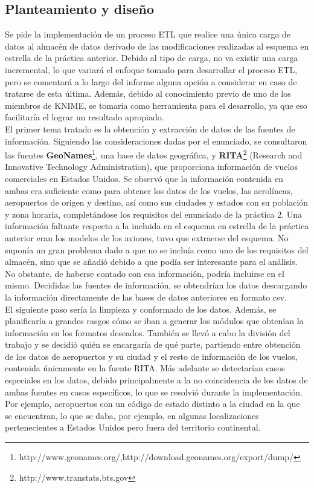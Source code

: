 \documentclass{article}
\begin{document}
\subsection{Planteamiento y diseño}
Se pide la implementación de un proceso ETL que realice una única carga de datos al almacén de datos derivado de las modificaciones realizadas al esquema en estrella de la práctica anterior. Debido al tipo de carga, no va existir una carga incremental, lo que variará el enfoque tomado para desarrollar el proceso ETL, pero se comentará a lo largo del informe alguna opción a considerar en caso de tratarse de esta última. Además, debido al conocimiento previo de uno de los miembros de KNIME, se tomaría como herramienta para el desarrollo, ya que eso facilitaría el lograr un resultado apropiado.\\

El primer tema tratado es la obtención y extracción de datos de las fuentes de información. Siguiendo las consideraciones dadas por el enunciado, se consultaron las fuentes \textbf{GeoNames}\footnote{http://www.geonames.org/,http://download.geonames.org/export/dump/}, una base de datos geográfica, y \textbf{RITA}\footnote{http://www.transtats.bts.gov} (Research and Innovative Technology Administration), que proporciona información de vuelos comerciales en Estados Unidos. Se observó que la información contenida en ambas era suficiente como para obtener los datos de los vuelos, las aerolíneas, aeropuertos de origen y destino, así como sus ciudades y estados con su población y zona horaria, completándose los requisitos del enunciado de la práctica 2. Una información faltante respecto a la incluida en el esquema en estrella de la práctica anterior eran los modelos de los aviones, tuvo que extraerse del esquema. No suponía un gran problema dado a que no se incluía como uno de los requisitos del almacén, sino que se añadió debido a que podía ser interesante para el análisis. No obstante, de haberse contado con esa información, podría incluirse en el mismo. Decididas las fuentes de información, se obtendrían los datos descargando la información directamente de las bases de datos anteriores en formato csv.\\

El siguiente paso sería la limpieza y conformado de los datos. Además, se planificaría a grandes rasgos cómo se iban a generar los módulos que obtenían la información en los formatos deseados. También se llevó a cabo la división del trabajo y se decidió quién se encargaría de qué parte, partiendo entre obtención de los datos de aeropuertos y su ciudad y el resto de información de los vuelos, contenida únicamente en la fuente RITA. Más adelante se detectarían casos especiales en los datos, debido principalmente a la no coincidencia de los datos de ambas fuentes en casos específicos, lo que se resolvió durante la implementación. Por ejemplo, aeropuertos con un código de estado distinto a la ciudad en la que se encuentran, lo que se daba, por ejemplo, en algunas localizaciones pertenecientes a Estados Unidos pero fuera del territorio continental.\\
\end{document}
